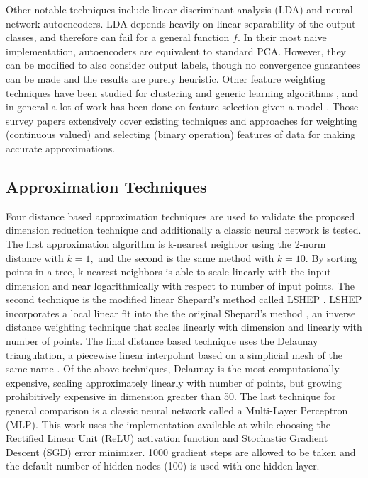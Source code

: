 \documentclass{scspaperproc}
\theoremstyle{scsthe}
\begin{document}
Other notable techniques include linear discriminant analysis (LDA)
and neural network autoencoders. LDA depends heavily on linear
separability of the output classes, and therefore can fail for a
general function $f$. In their most naive implementation, autoencoders
are equivalent to standard PCA. However, they can be modified to also
consider output labels, though no convergence guarantees can be made
and the results are purely heuristic. Other feature weighting
techniques have been studied for clustering and generic learning
algorithms
, and
in general a lot of work has been done on feature selection given a
model . Those survey
papers extensively cover existing techniques and approaches for
weighting (continuous valued) and selecting (binary operation)
features of data for making accurate approximations.

\subsection{Approximation Techniques}
\label{sec:approximation}

Four distance based approximation techniques are used to validate the
proposed dimension reduction technique and additionally a classic
neural network is tested. The first approximation algorithm is
k-nearest neighbor using the 2-norm distance with $k=1,$ and the
second is the same method with $k=10.$ By sorting points in a tree,
k-nearest neighbors is able to scale linearly with the input dimension
and near logarithmically with respect to number of input points. The
second technique is the modified linear Shepard's method called LSHEP
. LSHEP incorporates a local linear
fit into the the original Shepard's method ,
an inverse distance weighting technique that scales linearly with
dimension and linearly with number of points. The final distance based
technique uses the Delaunay triangulation, a piecewise linear
interpolant based on a simplicial mesh of the same name
. Of the above techniques, Delaunay is
the most computationally expensive, scaling approximately linearly
with number of points, but growing prohibitively expensive in
dimension greater than 50. The last technique for general comparison
is a classic neural network called a Multi-Layer Perceptron
(MLP). This work uses the implementation available at
 while choosing the Rectified Linear Unit
(ReLU) activation function and Stochastic Gradient Descent (SGD) error
minimizer. 1000 gradient steps are allowed to be taken and the default
number of hidden nodes (100) is used with one hidden layer.
\end{document}

